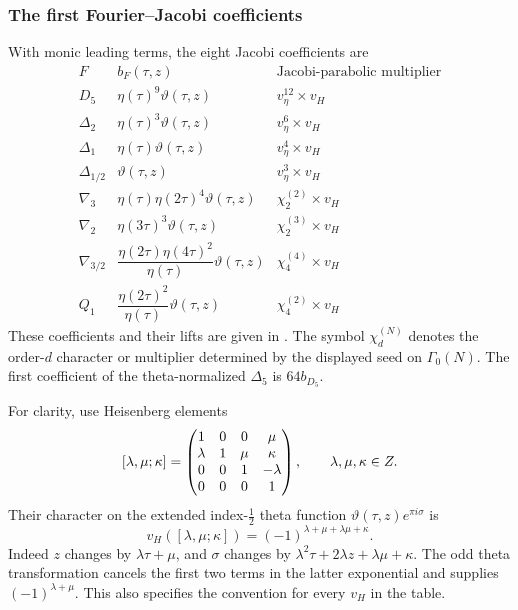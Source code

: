 \subsubsection{The first Fourier--Jacobi coefficients}
With monic leading terms, the eight Jacobi coefficients are
\[
\begin{array}{c|c|c}
 F&b_F(\tau,z)&\text{Jacobi-parabolic multiplier}\\ \hline
 D_5&\eta(\tau)^9\vartheta(\tau,z)&v_\eta^{12}\times v_H\\
 \Delta_2&\eta(\tau)^3\vartheta(\tau,z)&v_\eta^6\times v_H\\
 \Delta_1&\eta(\tau)\vartheta(\tau,z)&v_\eta^4\times v_H\\
 \Delta_{1/2}&\vartheta(\tau,z)&v_\eta^3\times v_H\\
 \nabla_3&\eta(\tau)\eta(2\tau)^4\vartheta(\tau,z)&\chi_2^{(2)}\times v_H\\
 \nabla_2&\eta(3\tau)^3\vartheta(\tau,z)&\chi_2^{(3)}\times v_H\\
 \nabla_{3/2}&\dfrac{\eta(2\tau)\eta(4\tau)^2}{\eta(\tau)}
                    \vartheta(\tau,z)&\chi_4^{(4)}\times v_H\\[5pt]
 Q_1&\dfrac{\eta(2\tau)^2}{\eta(\tau)}
                    \vartheta(\tau,z)&\chi_4^{(2)}\times v_H
\end{array}
\]
These coefficients and their lifts are given in
\cite[(13)--(19), \S3]{GC}.
The symbol \(\chi_d^{(N)}\) denotes the order-\(d\) character
or multiplier determined by the displayed seed on \(\Gamma_0(N)\).
The first coefficient of the theta-normalized \(\Delta_5\) is
\(64b_{D_5}\).

For clarity, use Heisenberg elements
\[
 [\lambda,\mu;\kappa]=
 \begin{pmatrix}
 1&0&0&\mu\\
 \lambda&1&\mu&\kappa\\
 0&0&1&-\lambda\\
 0&0&0&1
 \end{pmatrix},\qquad \lambda,\mu,\kappa\in Z.
\]
Their character on the extended index-\(\tfrac12\) theta
function \(\vartheta(\tau,z)e^{\pi i\sigma}\) is
\[
 v_H([\lambda,\mu;\kappa])
 =(-1)^{\lambda+\mu+\lambda\mu+\kappa}.
\]
Indeed \(z\) changes by \(\lambda\tau+\mu\), and \(\sigma\)
changes by
\(\lambda^2\tau+2\lambda z+\lambda\mu+\kappa\).
The odd theta transformation cancels the first two terms in the
latter exponential and supplies \((-1)^{\lambda+\mu}\).
This also specifies the convention for every \(v_H\) in the table.

